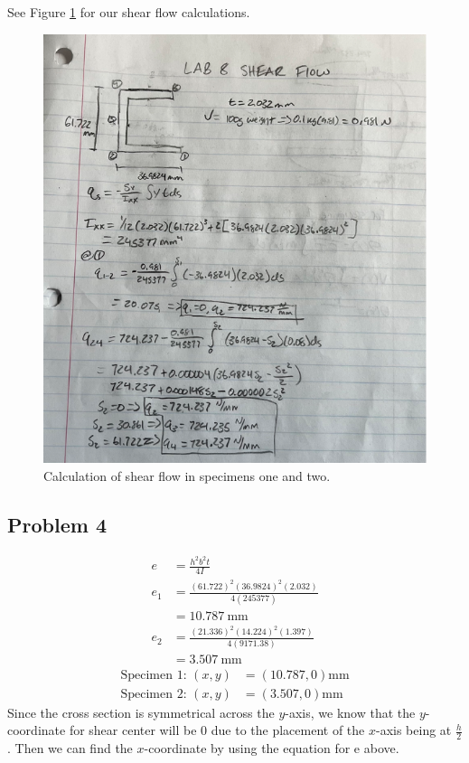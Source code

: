 \documentclass[12 pt]{report}
\begin{document}
See Figure \ref{fig:peter_work} for our shear flow calculations.

\begin{figure}[htbp]
	\centering
	\includegraphics[width=6in]{images/peter shear flow}
	\caption{Calculation of shear flow in specimens one and two.}
	\label{fig:peter_work}
\end{figure}

\subsection{Problem 4}\label{problem_4}
\begin{align*}
	e&=\frac{h^2b^2t}{4I}\\
	e_\num{1}&=\frac{(\num{61.722})^2(\num{36.9824})^2(\num{2.032})}{\num{4}(\num{245377})}\\
	&=\qty{10.787}{\mm}\\
	e_\num{2}&=\frac{(\num{21.336})^2(\num{14.224})^2(\num{1.397})}{\num{4}(\num{9171.38})}\\
	&=\qty{3.507}{\mm}
\end{align*}
\begin{align*}
	\text{Specimen }\num{1}\text{: }(x,y)&=(\num{10.787},\num{0}) \unit{\mm}\\
	\text{Specimen }\num{2}\text{: }(x,y)&=(\num{3.507},\num{0}) \unit{\mm}
\end{align*}
Since the cross section is symmetrical across the $y$-axis, we know that the $y$-coordinate for shear center will be \num{0} due to the placement of the $x$-axis being at $\frac{h}{2}$. Then we can find the $x$-coordinate by using the equation for e above.  
\end{document}
